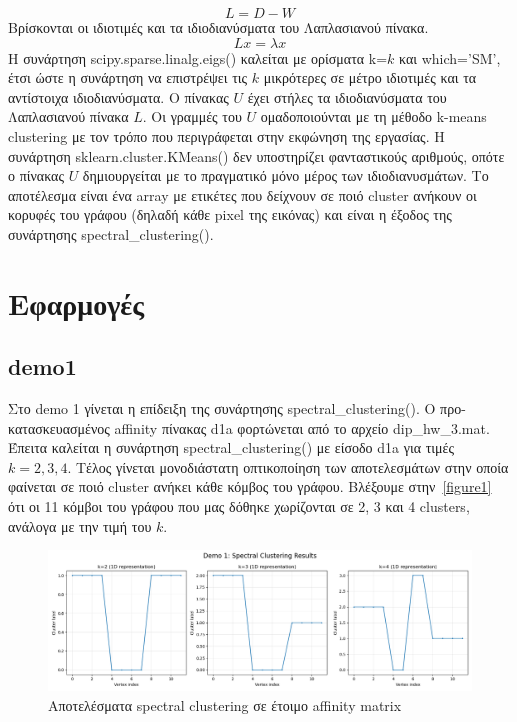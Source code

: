 \documentclass{article}
\begin{document}
\begin{equation}
    L = D - W
\end{equation}
Βρίσκονται οι ιδιοτιμές και τα ιδιοδιανύσματα του Λαπλασιανού πίνακα. 
\begin{equation}
    Lx = \lambda x
\end{equation}
Η συνάρτηση scipy.sparse.linalg.eigs() καλείται με ορίσματα k=$k$ και 
which='SM', έτσι ώστε η συνάρτηση να επι\-στρέψει τις $k$ μικρότερες σε μέτρο
ιδιοτιμές και τα αντίστοιχα ιδιοδιανύ\-σματα. Ο πίνακας $U$
έχει στήλες τα ιδιοδιανύ\-σματα του Λαπλασιανού πίνακα $L$. Οι γραμμές του
$U$ ομαδοποιούνται με τη μέθοδο k-means clustering με τον τρόπο που περιγράφεται 
στην εκφώνηση της εργασίας. Η συνάρτηση sklearn.cluster.KMeans()
δεν υποστηρίζει φανταστικούς αριθμούς, οπότε ο πίνακας $U$ δημιουργείται με
το πραγματικό μόνο μέρος των ιδιοδιανυσμάτων. Το αποτέλεσμα είναι ένα array με ετικέτες που 
δείχνουν σε ποιό cluster ανήκουν οι κορυφές του γράφου (δηλαδή κάθε pixel της
εικόνας) και είναι η έξοδος της συνάρτησης spectral\_clustering().

\section{Εφαρμογές}
\subsection{demo1} 
Στο demo 1 γίνεται η επίδειξη της συνάρτησης spectral\_clustering(). Ο 
προ-κατασκευασμένος affinity πίνακας d1a φορτώνεται από το αρχείο dip\_hw\_3.mat. 
Έπειτα καλείται η συνάρτηση spectral\_clustering() με είσοδο d1a για τιμές $k = 2,3,4$.
Τέλος γίνεται μονοδιάστατη οπτικοποίηση των αποτελεσμάτων στην οποία φαίνεται 
σε ποιό cluster ανήκει κάθε κόμβος του γράφου. 
Βλέξουμε στην~\autoref{figure1} ότι οι 11 κόμβοι του γράφου που μας δόθηκε
χωρίζονται σε 2, 3 και 4 clusters, ανάλογα με την τιμή του $k$.

\begin{figure}
    \centering
    \includegraphics[width=\linewidth]{Figure_1.png}
    \caption{Αποτελέσματα spectral clustering σε έτοιμο affinity matrix}\label{figure1}
\end{figure}
\end{document}
